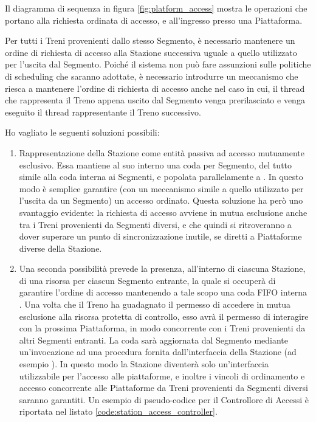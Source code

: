 		Il diagramma di sequenza in figura \ref{fig:platform_access} mostra le operazioni che portano alla richiesta ordinata di accesso, e all'ingresso presso una Piattaforma.
		\begin{description}
			\item{}
		
		Per tutti i Treni provenienti dallo stesso Segmento, è necessario mantenere un ordine di richiesta di accesso alla Stazione successiva uguale a quello utilizzato per l'uscita dal Segmento. Poiché il sistema non può fare assunzioni sulle politiche di scheduling che saranno adottate, è necessario introdurre un meccanismo che riesca a mantenere l'ordine di richiesta di accesso anche nel caso in cui, il thread che rappresenta il Treno appena uscito dal Segmento venga prerilasciato e venga eseguito il thread rappresentante il Treno successivo.

		Ho vagliato le seguenti soluzioni possibili:
		\begin{enumerate}
			\item Rappresentazione della Stazione come entità passiva ad accesso mutuamente esclusivo. Essa mantiene al suo interno una coda per Segmento, del tutto simile alla coda  interna ai Segmenti, e popolata parallelamente a . In questo modo è semplice garantire (con un meccanismo simile a quello utilizzato per l'uscita da un Segmento) un accesso ordinato. Questa soluzione ha però uno svantaggio evidente: la richiesta di accesso avviene in mutua esclusione anche tra i Treni provenienti da Segmenti diversi, e che quindi si ritroveranno a dover superare un punto di sincronizzazione inutile, se diretti a Piattaforme diverse della Stazione.
			
			\item Una seconda possibilità prevede la presenza, all'interno di ciascuna Stazione, di una risorsa   per ciascun Segmento entrante, la quale si occuperà di garantire l'ordine di accesso mantenendo a tale scopo una coda FIFO interna . Una volta che il Treno ha guadagnato il permesso di accedere in mutua esclusione alla risorsa protetta di controllo, esso avrà il permesso di interagire con la prossima Piattaforma, in modo concorrente con i Treni provenienti da altri Segmenti entranti. La coda  sarà aggiornata dal Segmento mediante un'invocazione ad una procedura fornita dall'interfaccia della Stazione (ad esempio ).
			In questo modo la Stazione diventerà solo un'interfaccia utilizzabile per l'accesso alle piattaforme, e inoltre i vincoli di ordinamento e accesso concorrente alle Piattaforme da Treni provenienti da Segmenti diversi saranno garantiti.
			Un esempio di pseudo-codice per il Controllore di Accessi è riportata nel listato \ref{code:station_access_controller}.
			

\end{enumerate}
\end{description}
